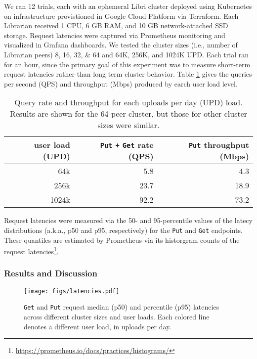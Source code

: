 \documentclass[10pt]{article}
\newcommand{\ttt}[1]{\texttt{#1}}
\def\Put{\ttt{Put}}
\def\Get{\ttt{Get}}
\begin{document}
We ran 12 trials, each with an ephemeral Libri cluster deployed using Kubernetes on infrastructure provistioned in Google Cloud Platform via Terraform. Each Librarian received 1 CPU, 6 GB RAM, and 10 GB network-attached SSD storage. Request latencies were captured via Prometheus monitoring and visualized in Grafana dashboards. We tested the cluster sizes (i.e., number of Librarian peers) 8, 16, 32, \& 64 and 64K, 256K, and 1024K UPD. Each trial ran for an hour, since the primary goal of this experiment was to measure short-term request latencies rather than long term cluster behavior. Table \ref{tbl:updload} gives the queries per second (QPS) and throughput (Mbps) produced by earch user load level. 

\begin{table}[t]
\centering
\begin{tabular}{rrr}
	\toprule
	user load (UPD) & \Put{} \ttt{+} \Get{} rate (QPS) & \Put{} throughput (Mbps) \\ \midrule
	64k & 5.8 & 4.3 \\
	256k & 23.7 & 18.9 \\
	1024k & 92.2 & 73.2 \\ \bottomrule
\end{tabular}
\caption{Query rate and throughput for each uploads per day (UPD) load. Results are shown for the 64-peer cluster, but those for other cluster sizes were similar.}
\label{tbl:updload}
\end{table}

Request latencies were measured via the 50- and 95-percentile values of the latecy distributions (a.k.a., p50 and p95, respectively) for the \ttt{Put} and \texttt{Get} endpoints. These quantiles are estimated by Prometheus via its historgram counts of the request latencies\footnote{\url{https://prometheus.io/docs/practices/histograms/}}.  

\subsubsection{Results and Discussion}

\begin{figure}[t]
	\centering
	\texttt{[image: figs/latencies.pdf]}
	\caption{\Get{} and \Put{} request median (p50) and  percentile (p95) latencies across different cluster sizes and user loads. Each colored line denotes a different user load, in uploads per day.}
	\label{fig:latencies}
\end{figure}
\end{document}

